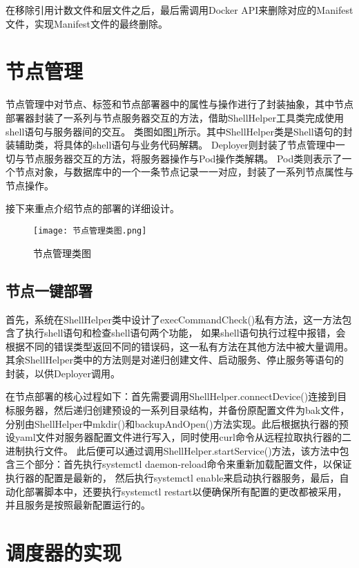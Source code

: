 在移除引用计数文件和层文件之后，最后需调用Docker API来删除对应的Manifest文件，实现Manifest文件的最终删除。


\section{节点管理}
节点管理中对节点、标签和节点部署器中的属性与操作进行了封装抽象，其中节点部署器封装了一系列与节点服务器交互的方法，借助ShellHelper工具类完成使用shell语句与服务器间的交互。
类图如图\ref{fig:节点管理类图}所示。其中ShellHelper类是Shell语句的封装辅助类，将具体的shell语句与业务代码解耦。
Deployer则封装了节点管理中一切与节点服务器交互的方法，将服务器操作与Pod操作类解耦。
Pod类则表示了一个节点对象，与数据库中的一个一条节点记录一一对应，封装了一系列节点属性与节点操作。

接下来重点介绍节点的部署的详细设计。

\begin{figure}[h]
  \centering
  \texttt{[image: 节点管理类图.png]}
  \caption{节点管理类图}
  \label{fig:节点管理类图}
\end{figure}

\subsection{节点一键部署}
首先，系统在ShellHelper类中设计了execCommandCheck()私有方法，这一方法包含了执行shell语句和检查shell语句两个功能，
如果shell语句执行过程中报错，会根据不同的错误类型返回不同的错误码，这一私有方法在其他方法中被大量调用。
其余ShellHelper类中的方法则是对递归创建文件、启动服务、停止服务等语句的封装，以供Deployer调用。

在节点部署的核心过程如下：首先需要调用ShellHelper.connectDevice()连接到目标服务器，然后递归创建预设的一系列目录结构，并备份原配置文件为bak文件，
分别由ShellHelper中mkdir()和backupAndOpen()方法实现。此后根据执行器的预设yaml文件对服务器配置文件进行写入，同时使用curl命令从远程拉取执行器的二进制执行文件。
此后便可以通过调用ShellHelper.startService()方法，该方法中包含三个部分：首先执行systemctl daemon-reload命令来重新加载配置文件，以保证执行器的配置是最新的，
然后执行systemctl enable来启动执行器服务，最后，自动化部署脚本中，还要执行systemctl restart以便确保所有配置的更改都被采用，并且服务是按照最新配置运行的。

\section{调度器的实现}

